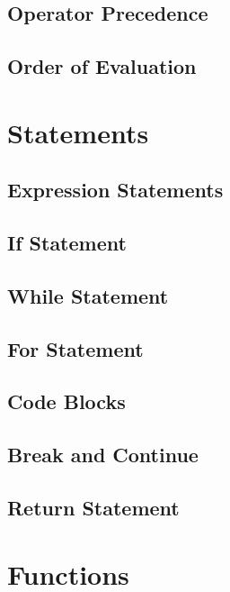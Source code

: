 \documentclass{article}
\begin{document}
\subsection{Operator Precedence}

\subsection{Order of Evaluation}

\section{Statements}

\subsection{Expression Statements}

\subsection{If Statement}

\subsection{While Statement}

\subsection{For Statement}

\subsection{Code Blocks}

\subsection{Break and Continue}

\subsection{Return Statement}

\section{Functions}
\end{document}
